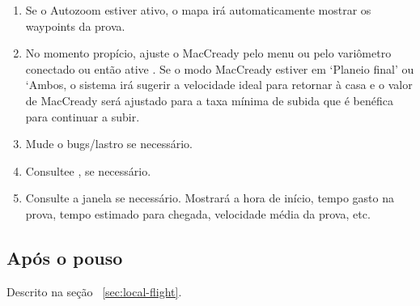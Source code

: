 \begin{enumerate}
\item Se o Autozoom estiver ativo, o mapa irá automaticamente mostrar os waypoints da prova.

\item  No momento propício, ajuste o MacCready pelo menu  ou pelo variômetro conectado ou então ative .
 Se o modo MacCready estiver em ‘Planeio final’ ou ‘Ambos, o sistema irá sugerir a velocidade ideal para retornar à casa e o valor de MacCready será ajustado para a taxa mínima de subida que é benéfica para continuar a subir.  
  
\item  Mude o bugs/lastro se necessário.
\item  Consultee , se necessário. 
\item  Consulte a janela  se necessário.  Mostrará a hora de início, tempo gasto na prova, tempo estimado para chegada, velocidade média da prova, etc. 
\end{enumerate}

\subsection*{Após o pouso}
Descrito na seção ~\ref{sec:local-flight}.

%
%
%
%

